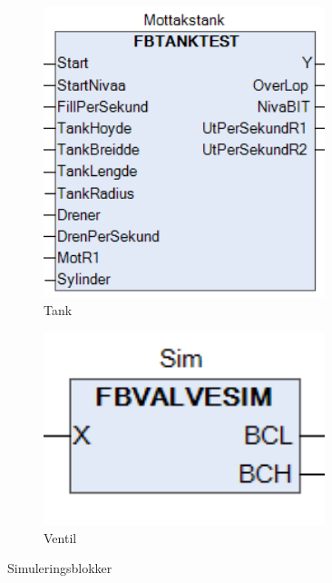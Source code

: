 \begin{figure}[htbp]
    \centering
    \begin{subfigure}[b]{0.3\textwidth}
        \centering
        \includegraphics[width=0.9\textwidth]{Figurar/TankSim.png}
        \caption{Tank}\label{fig:TankSim}
    \end{subfigure}
    \hfill
    \begin{subfigure}[b]{0.3\textwidth}
        \centering
        \includegraphics[width=0.9\textwidth]{Figurar/ValveSim.png}
        \caption{Ventil}\label{fig:ValveSim}
    \end{subfigure}
    \caption{Simuleringsblokker}\label{fig:SimuleringsBlokker}
\end{figure}

\newpage